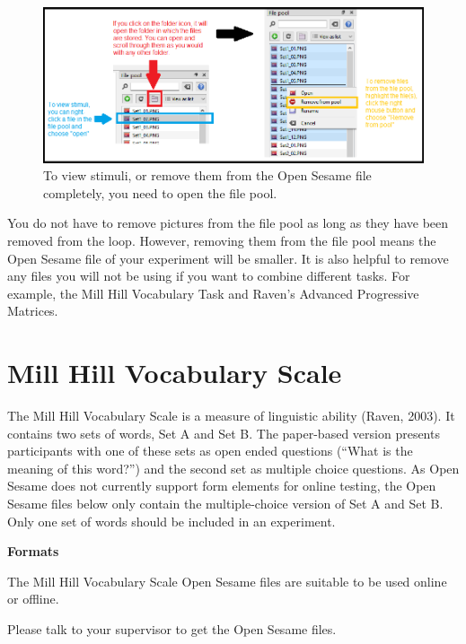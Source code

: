 \documentclass[
]{book}
\begin{document}
\begin{figure}

{\centering \includegraphics[width=0.99\linewidth]{images/AdvancedRPMFilePool} 

}

\caption{To view stimuli, or remove them from the Open Sesame file completely, you need to open the file pool.}\label{fig:Figure1-2}
\end{figure}

You do not have to remove pictures from the file pool as long as they have been removed from the loop. However, removing them from the file pool means the Open Sesame file of your experiment will be smaller. It is also helpful to remove any files you will not be using if you want to combine different tasks. For example, the Mill Hill Vocabulary Task and Raven's Advanced Progressive Matrices.

\hypertarget{mill-hill-vocabulary-scale}{%
\section{Mill Hill Vocabulary Scale}\label{mill-hill-vocabulary-scale}}

The Mill Hill Vocabulary Scale is a measure of linguistic ability (Raven, 2003). It contains two sets of words, Set A and Set B. The paper-based version presents participants with one of these sets as open ended questions (``What is the meaning of this word?'') and the second set as multiple choice questions. As Open Sesame does not currently support form elements for online testing, the Open Sesame files below only contain the multiple-choice version of Set A and Set B. Only one set of words should be included in an experiment.

\textbf{Formats}

The Mill Hill Vocabulary Scale Open Sesame files are suitable to be used online or offline.

Please talk to your supervisor to get the Open Sesame files.
\end{document}
